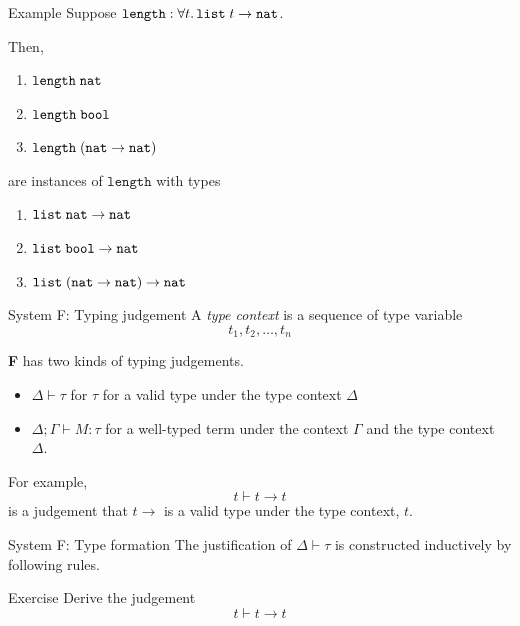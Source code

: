 \begin{frame}{Example}
  Suppose $\mathtt{length} : \forall t.\,\List\;t \to \nat$. 

  Then, 
  \begin{enumerate}
    \item $\mathtt{length}\;\nat$
    \item $\mathtt{length}\;\bool$
    \item $\mathtt{length}\;(\nat \to \nat)$
  \end{enumerate}
  are instances of $\mathtt{length}$ with types
  \begin{enumerate}
     \item $\List\; \nat \to \nat$
     \item $\List\;\bool \to \nat$
     \item $\List\;(\nat \to \nat) \to \nat$
  \end{enumerate}
\end{frame}

\begin{frame}{System F: Typing judgement}
  A \emph{type context} is a sequence of type variable 
  \[
    t_1, t_2, \dots, t_n
  \]

  \textbf{F} has two kinds of typing judgements.
  \begin{itemize}
    \item $\Delta \vdash \tau$ for $\tau$ for a valid type under the type context $\Delta$
    \item $\Delta; \Gamma \vdash M : \tau$ for a well-typed term under the context $\Gamma$ and the type context~$\Delta$.
  \end{itemize}
  For example,
    \[
      t \vdash t \to t
    \]
    is a judgement that $t \to $ is a valid type under the type context, $t$.

\end{frame}

\begin{frame}{System F: Type formation}
  The justification of $\Delta \vdash \tau$ is constructed inductively by following rules.
  \begin{multicols}{2}
    \begin{prooftree}
    \end{prooftree}
    \begin{prooftree}
    \end{prooftree}
    \columnbreak
    \begin{prooftree}
    \end{prooftree}
  \end{multicols}

  \begin{block}{Exercise}
    Derive the judgement 
    \[
        t \vdash t \to t
    \]
  \end{block}
\end{frame}

